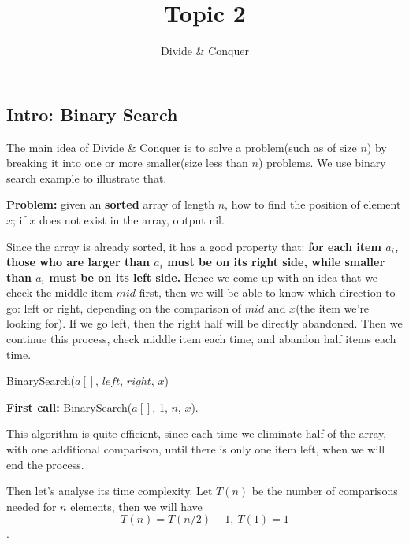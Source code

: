 \documentclass[11pt, a4paper]{COMP3711}
\title{Topic 2}
\subtitle{Divide \& Conquer}
\begin{document}
\begin{spacing}{1.5}
    
    \section{Intro: Binary Search}

    The main idea of {\rm Divide \& Conquer} is to solve a problem(such as of 
    size $n$) by breaking it into one or more smaller(size less than $n$) problems.
    We use binary search example to illustrate that.

    {\bf Problem:} given an {\bf sorted} array of length $n$, how to find 
    the position of element $x$; if $x$ does not exist
    in the array, output nil.

    Since the array is already sorted, it has a good property that:
    {\bf for each item $a_i$, those who are larger than $a_i$ must be 
    on its right side, while smaller than $a_i$ must be on its left side.}
    Hence we come up with an idea that we check the middle item $mid$ first,
    then we will be able to know which direction to go: left or right,
    depending on the comparison of $mid$ and $x$(the item we're looking for).
    If we go left, then the right half will be directly abandoned.
    Then we continue this process, check middle item each time, and 
    abandon half items each time.

    \begin{algorithm*}
        \caption{BinarySearch($a[]$, $left$, $right$, $x$)}
    \end{algorithm*}

    {\bf First call:} BinarySearch($a[]$, 1, $n$, $x$).

    This algorithm is quite efficient, since each time 
    we eliminate half of the array, with one additional 
    comparison, until there is only one item left,
    when we will end the process.

    Then let's analyse its time complexity. Let $T(n)$ be the number of 
    comparisons needed for $n$ elements, then we will have
    $$T(n)=T(n/2)+1,\ T(1)=1$$.


\end{spacing}
\end{document}
